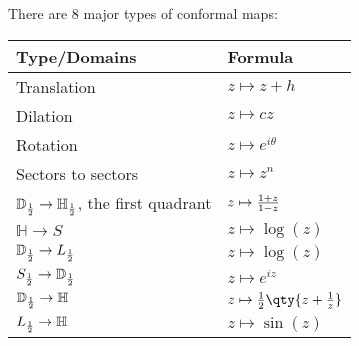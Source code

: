 \begin{theorem}

There are 8 major types of conformal maps:

\begin{longtable}[]{@{}
  >{\raggedright\arraybackslash}p{}
  >{\raggedright\arraybackslash}p{}@{}}
\toprule
Type/Domains & Formula \\
\midrule
\endhead
Translation & \(z\mapsto z + h\) \\
Dilation & \(z\mapsto cz\) \\
Rotation & \(z\mapsto e^{i\theta}\) \\
Sectors to sectors & \(z\mapsto z^n\) \\
\({\mathbb{D}}_{1\over 2} \to {\mathbb{H}}_{1\over 2}\), the first
quadrant & \(z\mapsto {1+z \over 1-z}\) \\
\({\mathbb{H}}\to S\) & \(z\mapsto \log(z)\) \\
\({\mathbb{D}}_{1\over 2} \to L_{1\over 2}\) & \(z\mapsto \log(z)\) \\
\(S_{1\over 2} \to {\mathbb{D}}_{1\over 2}\) & \(z\mapsto e^{iz}\) \\
\({\mathbb{D}}_{1\over 2} \to {\mathbb{H}}\) &
\(z\mapsto {1\over 2}\qty{z + {1\over z}}\) \\
\(L_{1\over 2} \to {\mathbb{H}}\) & \(z\mapsto \sin(z)\) \\
\bottomrule
\end{longtable}

\end{theorem}


